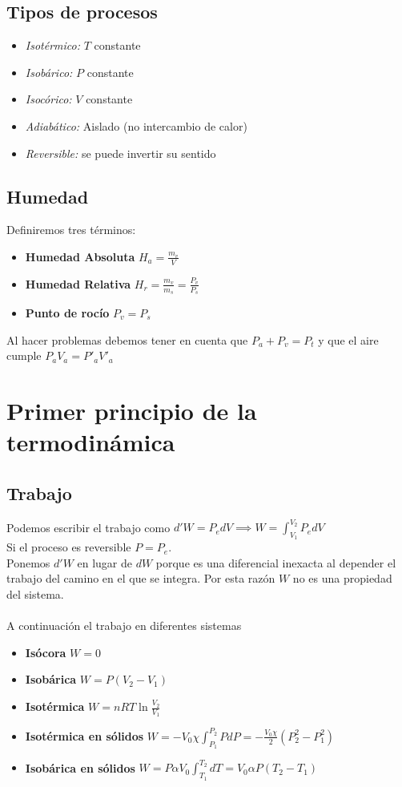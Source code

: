 \documentclass[leqno]{article}
\begin{document}
\subsection{Tipos de procesos}
\begin{itemize}
    \item \textit{Isotérmico:} $T$ constante
    \item \textit{Isobárico:} $P$ constante
    \item \textit{Isocórico:} $V$ constante
    \item \textit{Adiabático:} Aislado (no intercambio de calor)
    \item \textit{Reversible:} se puede invertir su sentido
\end{itemize}



\subsection{Humedad}
Definiremos tres términos:
\begin{itemize}
    \item \textbf{Humedad Absoluta} $H_a = \frac{m_v}{V}$
    \item \textbf{Humedad Relativa} $H_r=\frac{m_v}{m_s} = \frac{P_v}{P_s}$
    \item \textbf{Punto de rocío} $P_v=P_s$
\end{itemize}
Al hacer problemas debemos tener en cuenta que $P_a + P_v = P_t$ y que el aire cumple $P_aV_a = P'_aV'_a$

\section{Primer principio de la termodinámica}
\subsection{Trabajo}
Podemos escribir el trabajo como $\boxed{d'W = P_edV} \implies W = \int_{V_1}^{V_2}P_edV$ \\
Si el proceso es reversible $P = P_e$. \\
Ponemos $d'W$ en lugar de $dW$ porque es una diferencial inexacta al depender el trabajo del camino en el que se integra. Por esta razón $W$ no es una propiedad del sistema. \\
\\
A continuación el trabajo en diferentes sistemas
\begin{itemize}
    \item \textbf{Isócora} $W = 0$
    \item \textbf{Isobárica} $W = P(V_2-V_1)$
    \item \textbf{Isotérmica} $W = nRT\ln{\frac{V_2}{V_1}}$
    \item \textbf{Isotérmica en sólidos} $W = -V_0\chi\int_{P_1}^{P_2}PdP = -\frac{V_0\chi}{2}(P_2^2-P_1^2)$
    \item \textbf{Isobárica en sólidos} $W = P\alpha V_0\int_{T_1}^{T_2}dT = V_0\alpha P (T_2-T_1)$
\end{itemize}
\end{document}
